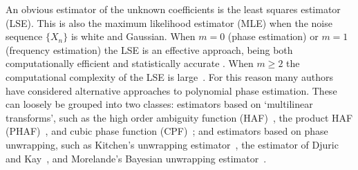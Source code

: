 \documentclass[journal]{IEEEtran}
\begin{document}
An obvious estimator of the unknown coefficients is the least squares estimator (LSE).  This is also the maximum likelihood estimator (MLE) when the noise sequence $\{X_n\}$ is white and Gaussian.  When $m=0$ (phase estimation) or $m=1$ (frequency estimation) the LSE is an effective approach, being both computationally efficient and statistically accurate \cite{Quinn2009_dasp_phase_only_information_loss,Hannan1973,Quinn2001,McKilliam_mean_dir_est_sq_arc_length2010,McKilliam2010thesis}. When $m \geq 2$ the computational complexity of the LSE is large~\cite{Oshea_cpf_2004,McKilliam2010thesis,Abatzoglou_ml_chirp_1986}. For this reason many authors have considered alternative approaches to polynomial phase estimation. These can loosely be grouped into two classes: estimators based on `multilinear transforms', such as the high order ambiguity function (HAF)~\cite{Peleg_DPT_1995,Peleg1991_est_class_PPS_1991,Porat_asympt_HAF_DPT_1996,Farquharson_another_poly_est_2005,Boashash_Oshea_1994,Barbarossa_analysis_of_PPS_1997}, the product HAF (PHAF)~\cite{Barbarossa_PHAF_1998}, and cubic phase function (CPF)~\cite{Oshea_cpf_2004,Oshea_cpf_2002_letter,Djurovic_haf_cpf_2012,OShea_new_class_multilinear_2009}; and estimators based on phase unwrapping, such as Kitchen's unwrapping estimator~\cite{Kitchen_polyphase_unwrapping_1994}, the estimator of Djuric and Kay~\cite{Djuric_phase_unwrap_chirp_1990}, and Morelande's Bayesian unwrapping estimator~\cite{Morelande_bayes_unwrapping_2009_tsp}.
\end{document}
